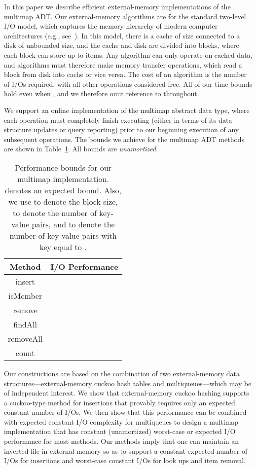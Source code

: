 \documentclass[11pt,letterpaper]{article}
\begin{document}
In this paper we describe efficient external-memory
implementations of the multimap ADT.  Our external-memory algorithms are
for the standard two-level I/O model, which captures the memory hierarchy of
modern computer architectures (e.g.,
see~\cite{av-iocsr-88,DBLP:reference/algo/Vitter08}). In this model, there is a cache of size  connected to a disk of
unbounded size, and the cache and disk are divided into blocks,
where each block can store up to  items. Any algorithm can only operate on cached data,
and algorithms must therefore make memory transfer operations,
which read a block from disk into cache or vice versa.
The cost of an algorithm is the number of I/Os required,
with all other operations considered free.
All of our time bounds hold even when ,
and we therefore omit reference to 
throughout. 

We support an online implementation of the multimap
abstract data type, where each operation must 
completely finish executing (either in terms of its data structure updates or
query reporting) prior to our beginning execution of any subsequent
operations.
The bounds we achieve for the multimap ADT methods are shown in
Table~\ref{tbl:bounds}. All bounds are \emph{unamortized}. 

\begin{table}[hbt]
\begin{center}
\begin{tabular}{|c|c|}
\hline
\textbf{Method} & \textbf{I/O Performance} \\
\hline
\rule[-8pt]{0pt}{22pt} insert &  \\
\hline
\rule[-8pt]{0pt}{22pt} isMember &  \\
\hline
\rule[-8pt]{0pt}{22pt} remove &  \\
\hline
\rule[-8pt]{0pt}{22pt} findAll &  \\
\hline
\rule[-8pt]{0pt}{22pt} removeAll &  \\
\hline
\rule[-8pt]{0pt}{22pt} count &  \\
\hline
\end{tabular}
\end{center}
\caption{\label{tbl:bounds} Performance bounds for our multimap
implementation.  denotes an expected bound.
Also, we use
 to denote the block size,  to denote the number of key-value
pairs, 
and
 to denote the number of key-value pairs with key equal to . 
}
\end{table}

Our constructions are based on the combination of two 
external-memory data structures---external-memory cuckoo hash tables
and multiqueues---which may be of independent interest.
We show that external-memory cuckoo hashing supports
a cuckoo-type method for insertions that provably requires only an expected constant number
of I/Os. We then show that this performance can be combined with
expected constant I/O complexity for multiqueues to design a multimap
implementation that has constant (unamortized) worst-case or expected
I/O performance for most methods.
Our methods imply that one can maintain an inverted file in
external memory so as to support a constant 
expected number of I/Os for
insertions and worst-case constant I/Os for look ups and
item removal.
\end{document}
